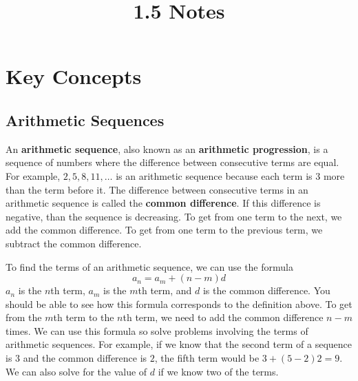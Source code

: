 \documentclass{article}
\title{1.5 Notes}
\author{}
\date{}
\begin{document}
    \maketitle

    \section*{Key Concepts}
    \subsection*{Arithmetic Sequences}
    An \textbf{arithmetic sequence}, also known as an \textbf{arithmetic
    progression}, is a sequence of numbers where the difference between
    consecutive terms are equal. For example, $2, 5, 8, 11, \dots$ is an
    arithmetic sequence because each term is $3$ more than the term before it.
    The difference between consecutive terms in an arithmetic sequence is called
    the \textbf{common difference}. If this difference is negative, than the
    sequence is decreasing. To get from one term to the next, we add the common
    difference. To get from one term to the previous term, we subtract the
    common difference.

    To find the terms of an arithmetic sequence, we can use the formula
    \[a_n = a_m + (n - m)d\] $a_n$ is the $n$th term, $a_m$ is the $m$th term,
    and $d$ is the common difference. You should be able to see how this formula
    corresponds to the definition above. To get from the $m$th term to the $n$th
    term, we need to add the common difference $n - m$ times. We can use this
    formula so solve problems involving the terms of arithmetic sequences. For
    example, if we know that the second term of a sequence is $3$ and the common
    difference is $2$, the fifth term would be $3 + (5 - 2)2 = 9$. We can also
    solve for the value of $d$ if we know two of the terms.
\end{document}
